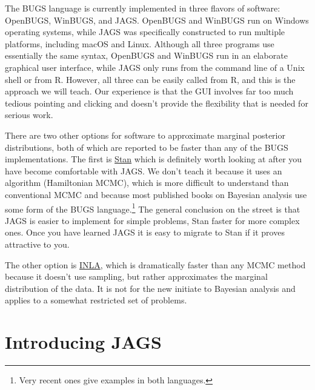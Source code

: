 \documentclass[12pt,english]{article}
\begin{document}
The BUGS language is currently implemented in three flavors of software: OpenBUGS, WinBUGS, and JAGS. OpenBUGS and WinBUGS run on Windows operating systems, while JAGS was specifically constructed to run multiple platforms, including macOS and Linux. Although all three programs use essentially the same syntax, OpenBUGS and WinBUGS run in an elaborate graphical user interface, while JAGS only runs from the command line of a Unix shell or from R. However, all three can be easily called from R, and this is the approach we will teach. Our experience is that the GUI involves far too much tedious pointing and clicking and doesn't provide the flexibility that is needed for serious work. 

There are two other options for software to approximate marginal posterior distributions, both of which are reported to be faster than any of the BUGS implementations. The first is \href{http://mc-stan.org/}{Stan} which is definitely worth looking at after you have become comfortable with JAGS. We don't teach it because it uses an algorithm (Hamiltonian MCMC), which is more difficult to understand than conventional MCMC and because most published books on Bayesian analysis use some form of the BUGS language.\footnote{Very recent ones give examples in both languages.} The general conclusion on the street is that JAGS is easier to implement for simple problems, Stan faster for more complex ones. Once you have learned JAGS it is easy to migrate to Stan if it proves attractive to you. 

The other option is \href{http://www.r-inla.org/}{INLA}, which is dramatically faster than any MCMC method because it doesn't use sampling, but rather approximates the marginal distribution of the data. It is not for the new initiate to Bayesian analysis and applies to a somewhat restricted set of problems.

\section{Introducing JAGS}
\end{document}
